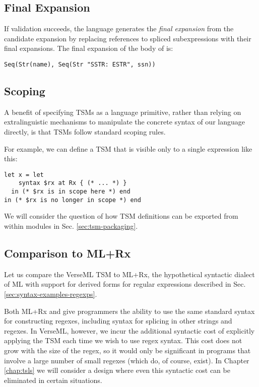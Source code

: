 \subsection{Final Expansion}
If validation succeeds, the language generates the \emph{final expansion} from the candidate expansion by replacing references to spliced subexpressions with their final expansions. The final expansion of the body of  is:
\begin{lstlisting}[numbers=none]
Seq(Str(name), Seq(Str "SSTR: ESTR", ssn))
\end{lstlisting}

\subsection{Scoping}
A benefit of specifying TSMs as a language primitive, rather than relying on extralinguistic mechanisms to manipulate the concrete syntax of our language directly, is that TSMs follow standard scoping rules. 

For example, we can define a TSM that is visible only to a single expression like this:
\begin{lstlisting}[numbers=none]
let x = let 
    syntax $rx at Rx { (* ... *) }
  in (* $rx is in scope here *) end 
in (* $rx is no longer in scope *) end
\end{lstlisting}

We will consider the question of how TSM definitions can be exported from within modules in Sec. \ref{sec:tsm-packaging}.

\subsection{Comparison to ML+Rx}
Let us compare the VerseML TSM  to ML+Rx, the hypothetical syntactic dialect of ML with support for derived forms for regular expressions described in Sec. \ref{sec:syntax-examples-regexps}.

Both ML+Rx and  give programmers the ability to use the same standard syntax for constructing regexes, including syntax for splicing in other strings and regexes. In VerseML, however, we incur the additional syntactic cost of explicitly applying the  TSM each time we wish to use regex syntax. This cost does not grow with the size of the regex, so it would only be significant in programs that involve a large number of small regexes (which do, of course, exist). In Chapter \ref{chap:tsls} we will consider a design where even this syntactic cost can be eliminated in certain situations.


